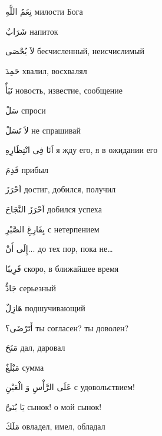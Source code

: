 \documentclass[a5paper]{article}
\newcommand\textstyleDropCaps[1]{#1}
\newcommand\textstyleCaptioncharacters[1]{#1}
\begin{document}
\textstyleCaptioncharacters{نِعَمُ اللَّهِ }\textstyleDropCaps{милости Бога‎}

\textstyleCaptioncharacters{شَرَابٌ }\textstyleDropCaps{напиток‎}

\textstyleCaptioncharacters{لاَ يُحْصَى }\textstyleDropCaps{бесчислен­ный, неисчислимый‎}

\textstyleCaptioncharacters{حَمِدَ }\textstyleDropCaps{хвалил, восхвалял‎}

\textstyleCaptioncharacters{نَبَأٌ }\textstyleDropCaps{новость, известие, сообщ­ение‎}

\textstyleCaptioncharacters{سَلْ }\textstyleDropCaps{спроси‎}

\textstyleCaptioncharacters{لاَ تَسَلْ }\textstyleDropCaps{не спрашивай‎}

\textstyleCaptioncharacters{اَنَا فِى انْتِظَارِهِ }\textstyleDropCaps{я жду его, я в ожидании его‎}

\textstyleCaptioncharacters{قَدِمَ }\textstyleDropCaps{прибыл‎}

\textstyleCaptioncharacters{اَحْرَزَ }\textstyleDropCaps{достиг, добился, по­лучил‎}

\textstyleCaptioncharacters{اَحْرَزَ النَّجَاحَ }\textstyleDropCaps{добился успеха‎}

\textstyleCaptioncharacters{بِفَارِغِ الصَّبْرِ }\textstyleDropCaps{с нетерпе­нием‎}

\textstyleCaptioncharacters{إِلَى أَنْ... }\textstyleDropCaps{до тех пор, пока не…‎}

\textstyleCaptioncharacters{قَرِيبًا }\textstyleDropCaps{скоро, в ближайшее время‎}

\textstyleCaptioncharacters{جَادٌّ }\textstyleDropCaps{серьезный‎}

\textstyleCaptioncharacters{هَازِلٌ }\textstyleDropCaps{подшучивающий‎}

\textstyleCaptioncharacters{أَتَرْضَى؟ }\textstyleDropCaps{ты согласен? ты доволен?‎}

\textstyleCaptioncharacters{مَنَحَ }\textstyleDropCaps{дал, даровал‎}

\textstyleCaptioncharacters{مَبْلَغٌ }\textstyleDropCaps{сумма‎}

\textstyleCaptioncharacters{عَلَى الرَّأْسِ وَ الْعَيْنِ }\textstyleDropCaps{с удовольствием!‎}

\textstyleCaptioncharacters{يَا بُنَىَّ }\textstyleDropCaps{сынок! о мой сы­нок!‎}

\textstyleCaptioncharacters{مَلَكَ }\textstyleDropCaps{овладел, имел, обла­дал‎}
\end{document}
